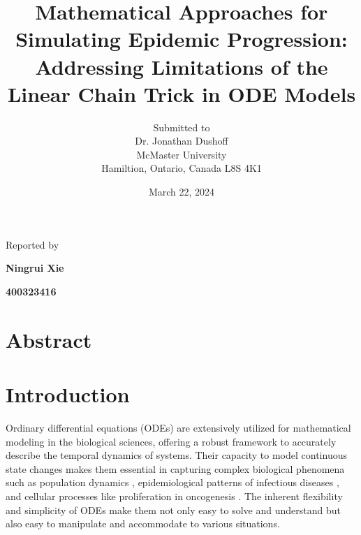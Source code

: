 \documentclass[12pt]{article}
\begin{document}
\title{Mathematical Approaches for Simulating Epidemic Progression: Addressing Limitations of the Linear Chain Trick in ODE Models}

\author{Submitted to\\ Dr. Jonathan Dushoff 
\\McMaster University\\Hamiltion, Ontario, Canada L8S 4K1}
\date {March 22, 2024}
\maketitle


\centerline{Reported by}
\centerline{\textbf{Ningrui Xie}}
\centerline{\textbf{400323416}}


\newpage
\section{Abstract}

\section{Introduction}
Ordinary differential equations (ODEs) are extensively utilized for mathematical modeling in the biological sciences, offering a robust framework to accurately describe the temporal dynamics of systems. Their capacity to model continuous state changes makes them essential in capturing complex biological phenomena such as population dynamics \cite{salisbury2011mathematical}\cite{sego2021generation}, epidemiological patterns of infectious diseases \cite{Anderson1991}\cite{Diekmann2000}\cite{Feng2016}, and cellular processes like proliferation in oncogenesis \cite{baker1998modelling}\cite{jarrett2018mathematical}. The inherent flexibility and simplicity of ODEs make them not only easy to solve and understand but also easy to manipulate and accommodate to various situations.
\end{document}

